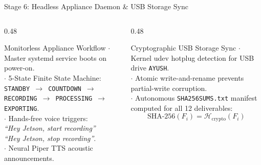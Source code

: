 \documentclass[aspectratio=169,10pt]{beamer}
\begin{document}
\begin{frame}{Stage 6: Headless Appliance Daemon \& USB Storage Sync}
  \begin{columns}[T]
    \begin{column}{0.48\textwidth}
      \begin{block}{Monitorless Appliance Workflow}
        \footnotesize
        $\cdot$ Master systemd service boots on power-on.\\
        $\cdot$ 5-State Finite State Machine:\\
        \texttt{STANDBY $\to$ COUNTDOWN $\to$ RECORDING $\to$ PROCESSING $\to$ EXPORTING}.\\
        $\cdot$ Hands-free voice triggers:\\
        \textit{``Hey Jetson, start recording''}\\
        \textit{``Hey Jetson, stop recording''}.\\
        $\cdot$ Neural Piper TTS acoustic announcements.
      \end{block}
    \end{column}
    \begin{column}{0.48\textwidth}
      \begin{block}{Cryptographic USB Storage Sync}
        \footnotesize
        $\cdot$ Kernel udev hotplug detection for USB drive \texttt{AYUSH}.\\
        $\cdot$ Atomic write-and-rename prevents partial-write corruption.\\
        $\cdot$ Autonomous \texttt{SHA256SUMS.txt} manifest computed for all 12 deliverables:
        \[ \text{SHA-256}(F_i) = \mathcal{H}_{\text{crypto}}(F_i) \]
      \end{block}
    \end{column}
  \end{columns}
\end{frame}
\end{document}
